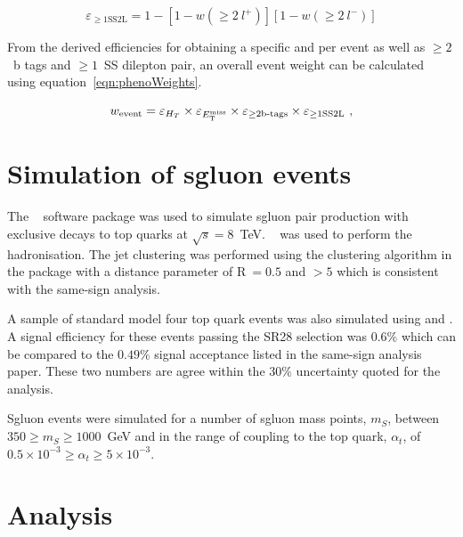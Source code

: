 \begin{equation}
\varepsilon_{\geq1 \text{SS2L}} = 1 - \left[1-w(\geq2~l^{+})\right]\left[1-w(\geq2~l^{-})\right]
\label{eqn:al1}
\end{equation}

From the derived efficiencies for obtaining a specific \HT and \MET per event as well as $\geq2$~b tags and $\geq1$~SS dilepton pair, an overall event weight can be calculated using equation~\ref{eqn:phenoWeights}.

\begin{equation} \label{eqn:phenoWeights}
  w_{\rm event} = \varepsilon_{H_T} \times  \varepsilon_{E_{\mathrm{T}}^{\text{miss}}} \times
    \varepsilon_{\geq\text{2b-tags}} \times \varepsilon_{\geq1 \text{SS2L}} \ ,
\end{equation}

\section{Simulation of sgluon events \label{sec:sgluonSim}}
The \MGfive~\cite{Alwall2014} software package was used to simulate sgluon pair production with exclusive decays to top quarks at $\sqrt{s}=8$~TeV. \PYTHIAsix~\cite{pythia} was used to perform the hadronisation. The jet clustering was performed using the \antikt clustering algorithm in the \FASTJET package with a distance parameter of R$~=0.5$ and \pt$>5$ which is consistent with the same-sign analysis.

A sample of standard model four top quark events was also simulated using \MGfive and \PYTHIAsix. A signal efficiency for these events passing the SR28 selection was $0.6\%$ which can be compared to the $0.49\%$ signal acceptance listed in the same-sign analysis paper. These two numbers are agree within the $30\%$ uncertainty quoted for the analysis.

Sgluon events were simulated for a number of sgluon mass points, $m_{S}$, between $350 \geq m_{S} \geq 1000$~GeV and in the range of coupling to the top quark, $\alpha_{t}$, of $0.5 \times 10^{-3}\geq \alpha_{t} \geq 5 \times 10^{-3}$.

\section{Analysis \label{sec:sgluonAna}}

